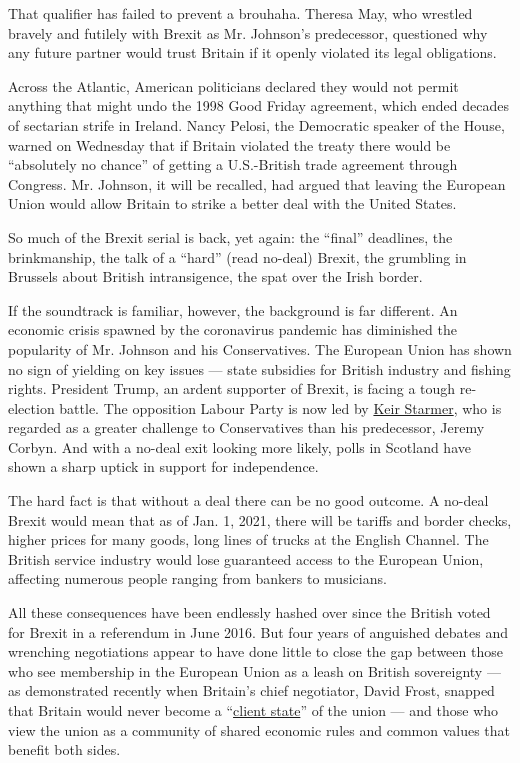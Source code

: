 That qualifier has failed to prevent a brouhaha. Theresa May, who
wrestled bravely and futilely with Brexit as Mr. Johnson's predecessor,
questioned why any future partner would trust Britain if it openly
violated its legal obligations.

Across the Atlantic, American politicians declared they would not permit
anything that might undo the 1998 Good Friday agreement, which ended
decades of sectarian strife in Ireland. Nancy Pelosi, the Democratic
speaker of the House, warned on Wednesday that if Britain violated the
treaty there would be ``absolutely no chance'' of getting a U.S.-British
trade agreement through Congress. Mr. Johnson, it will be recalled, had
argued that leaving the European Union would allow Britain to strike a
better deal with the United States.

So much of the Brexit serial is back, yet again: the ``final''
deadlines, the brinkmanship, the talk of a ``hard'' (read no-deal)
Brexit, the grumbling in Brussels about British intransigence, the spat
over the Irish border.

If the soundtrack is familiar, however, the background is far different.
An economic crisis spawned by the coronavirus pandemic has diminished
the popularity of Mr. Johnson and his Conservatives. The European Union
has shown no sign of yielding on key issues --- state subsidies for
British industry and fishing rights. President Trump, an ardent
supporter of Brexit, is facing a tough re-election battle. The
opposition Labour Party is now led by
\href{https://www.nytimes3xbfgragh.onion/2020/04/04/world/europe/labour-party-keir-starmer.html}{Keir
Starmer}, who is regarded as a greater challenge to Conservatives than
his predecessor, Jeremy Corbyn. And with a no-deal exit looking more
likely, polls in Scotland have shown a sharp uptick in support for
independence.

The hard fact is that without a deal there can be no good outcome. A
no-deal Brexit would mean that as of Jan. 1, 2021, there will be tariffs
and border checks, higher prices for many goods, long lines of trucks at
the English Channel. The British service industry would lose guaranteed
access to the European Union, affecting numerous people ranging from
bankers to musicians.

All these consequences have been endlessly hashed over since the British
voted for Brexit in a referendum in June 2016. But four years of
anguished debates and wrenching negotiations appear to have done little
to close the gap between those who see membership in the European Union
as a leash on British sovereignty --- as demonstrated recently when
Britain's chief negotiator, David Frost, snapped that Britain would
never become a
``\href{https://www.bbc.com/news/uk-politics-54045653}{client state}''
of the union --- and those who view the union as a community of shared
economic rules and common values that benefit both sides.


